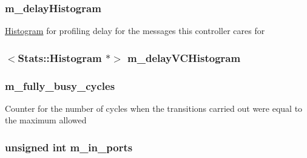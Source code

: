 \label{classAbstractController_aef85e61fde66cb7b942c755043b43520}
\hypertarget{classAbstractController_a32315b21a536469475414901e05bfe36}{
\subsubsection[{m\_\-delayHistogram}]{ {\bf m\_\-delayHistogram}}}
\label{classAbstractController_a32315b21a536469475414901e05bfe36}
\hyperlink{classHistogram}{Histogram} for profiling delay for the messages this controller cares for \hypertarget{classAbstractController_aba317e33c2fc730b07d01be02e743bd7}{
\subsubsection[{m\_\-delayVCHistogram}]{$<${\bf Stats::Histogram} $\ast$$>$ {\bf m\_\-delayVCHistogram}}}
\label{classAbstractController_aba317e33c2fc730b07d01be02e743bd7}
\hypertarget{classAbstractController_a0de33847c40bca29af78bf6c48a40e0c}{
\subsubsection[{m\_\-fully\_\-busy\_\-cycles}]{ {\bf m\_\-fully\_\-busy\_\-cycles}}}
\label{classAbstractController_a0de33847c40bca29af78bf6c48a40e0c}
Counter for the number of cycles when the transitions carried out were equal to the maximum allowed \hypertarget{classAbstractController_af686856d627ada54f36461fd10bc0371}{
\subsubsection[{m\_\-in\_\-ports}]{\setlength{\rightskip}{0pt plus 5cm}unsigned int {\bf m\_\-in\_\-ports}}}
